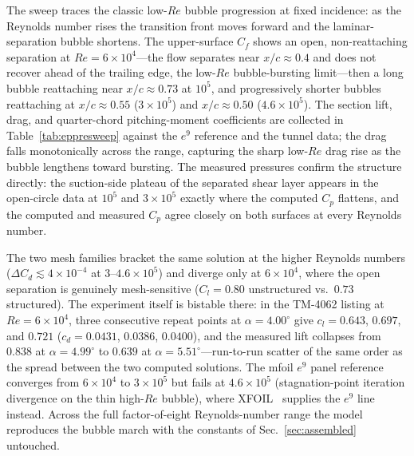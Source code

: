 \documentclass[journal]{new-aiaa}
\begin{document}
The sweep traces the classic low-$Re$ bubble progression at fixed incidence: as
the Reynolds number rises the transition front moves forward and the
laminar-separation bubble shortens. The upper-surface $C_f$ shows an open,
non-reattaching separation at $Re\!=\!6\!\times\!10^4$---the flow separates near
$x/c\!\approx\!0.4$ and does not recover ahead of the trailing edge, the
low-$Re$ bubble-bursting limit---then a long bubble reattaching near
$x/c\!\approx\!0.73$ at $10^5$, and progressively shorter bubbles reattaching at
$x/c\!\approx\!0.55$ ($3\!\times\!10^5$) and $x/c\!\approx\!0.50$
($4.6\!\times\!10^5$). The section lift, drag, and quarter-chord pitching-moment
coefficients are collected in Table~\ref{tab:eppresweep} against the $e^9$
reference and the tunnel data; the drag falls monotonically across the range,
capturing the sharp low-$Re$ drag rise as the bubble lengthens toward
bursting. The measured
pressures confirm the structure directly: the suction-side plateau of the
separated shear layer appears in the open-circle data at $10^5$ and
$3\!\times\!10^5$ exactly where the computed $C_p$ flattens, and the computed and
measured $C_p$ agree closely on both surfaces at every Reynolds number.

The two mesh families bracket the same solution at the higher
Reynolds numbers ($\Delta C_d\!\lesssim\!4\!\times\!10^{-4}$ at
$3$--$4.6\!\times\!10^5$) and diverge only at $6\!\times\!10^4$, where the open
separation is genuinely mesh-sensitive ($C_l\!=\!0.80$ unstructured vs.\ $0.73$
structured). The experiment itself is bistable there: in the TM-4062 listing at
$Re\!=\!6\!\times\!10^4$, three consecutive repeat points at
$\alpha\!=\!4.00^\circ$ give $c_l\!=\!0.643$, $0.697$, and $0.721$
($c_d\!=\!0.0431$, $0.0386$, $0.0400$), and the measured lift collapses from
$0.838$ at $\alpha\!=\!4.99^\circ$ to $0.639$ at
$\alpha\!=\!5.51^\circ$---run-to-run scatter of the same order as the spread
between the two computed solutions. The mfoil $e^9$ panel reference converges from
$6\!\times\!10^4$ to $3\!\times\!10^5$ but fails at $4.6\!\times\!10^5$
(stagnation-point iteration divergence on the thin high-$Re$ bubble), where
XFOIL~\cite{drela_xfoil_1989} supplies the $e^9$ line
instead. Across the full factor-of-eight Reynolds-number range the model
reproduces the bubble march with the constants of Sec.~\ref{sec:assembled}
untouched.
\end{document}
